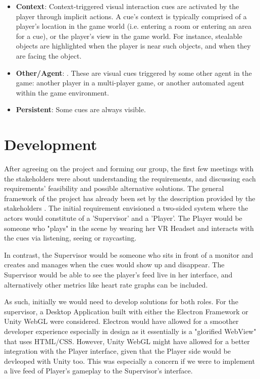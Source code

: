 \documentclass[conference]{IEEEtran}
\begin{document}
\begin{itemize}
    \item \textbf{Context}: Context-triggered visual interaction cues are activated by the player through implicit actions. A cue’s context is typically comprised of a player’s location in the game world (i.e. entering a room or entering an area for a cue), or the player’s view in the game world. For instance, stealable objects are highlighted when the player is near such objects, and when they are facing the object.
    \item \textbf{Other/Agent}: . These are visual cues triggered by some other agent in the game: another player in a multi-player game, or another automated agent within the game environment.
    \item \textbf{Persistent}: Some cues are always visible.
\end{itemize}

\begin{comment}
Raphael Grasset, Alessandro Mulloni, Mark 
Billinghurst, and Dieter Schmalstieg. 2011. Navigation 
Techniques in Augmented and Mixed Reality: 
Crossing the Virtuality Continuum. In Handbook of 
Augmented Reality. Springer, New York, NY, 379–
407. https://doi.org/10.1007/978-1-4614-0064-6_18


\end{comment}

\section{Development}
After agreeing on the project and forming our group, the first few meetings with the stakeholders were about understanding the requirements, and discussing each requirements' feasibility and possible alternative solutions. The general framework of the project has already been set by the description provided by the stakeholders \cite{hci_project_description}. The initial requirement envisioned a two-sided system where the actors would constitute of a 'Supervisor' and a 'Player'. The Player would be someone who "plays" in the scene by wearing her VR Headset and interacts with the cues via listening, seeing or raycasting. 

In contrast, the Supervisor would be someone who sits in front of a monitor and creates and manages when the cues would show up and disappear. The Supervisor would be able to see the player's feed live in her interface, and alternatively other metrics like heart rate graphs can be included.

As such, initially we would need to develop solutions for both roles. For the supervisor, a Desktop Application built with either the Electron Framework \cite{electronjs} or Unity WebGL \cite{unity_webgl} were considered. Electron would have allowed for a smoother developer experience especially in design as it essentially is a "glorified WebView" that uses HTML/CSS. However, Unity WebGL might have allowed for a better integration with the Player interface, given that the Player side would be devleoped with Unity too. This was especially a concern if we were to implement a live feed of Player's gameplay to the Supervisor's interface.
\end{document}
